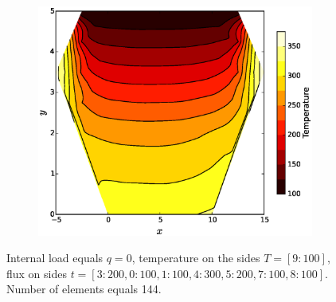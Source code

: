 \documentclass[10pt, a4paper]{article}
\begin{document}
\begin{figure}[H]
\begin{subfigure}[H]{0.33\textwidth}
	\end{subfigure}
	\begin{subfigure}[H]{0.33\textwidth}
		\includegraphics[width=\textwidth]{fig/test4_3.eps}
		\caption{}
		\label{fig:3}
	\end{subfigure}
	\caption{Internal load equals $q=0$, temperature on the sides $T=[9:100]$, flux on sides $t=[3:200, 0:100, 1:100, 4:300, 5:200, 7:100, 8:100]$. Number of elements equals 144.}
	\label{fig:3_1}
\end{figure}
\end{document}
